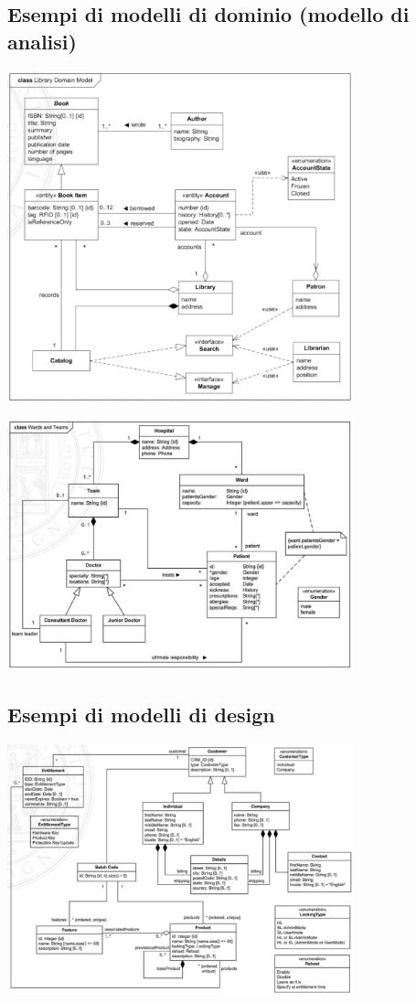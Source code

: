 \documentclass{article}
\begin{document}
\subsection*{Esempi di modelli di dominio (modello di analisi)}
\large
\begin{center}
    \includegraphics[width=0.75\textwidth]{foto 13.png}
\end{center}
\begin{center}
    \includegraphics[width=0.75\textwidth]{foto 14.png}
\end{center}

\subsection*{Esempi di modelli di design}
\large
\begin{center}
    \includegraphics[width=0.75\textwidth]{foto 15.png}
\end{center}
\end{document}
